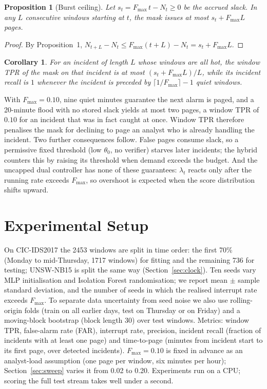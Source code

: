 \documentclass[journal,10pt,twocolumn]{IEEEtran}
\newtheorem{proposition}{Proposition}
\newtheorem{corollary}{Corollary}
\newcommand{\Fmax}{F_{\max}}
\begin{document}
\begin{proposition}[Burst ceiling]
Let $s_t=\Fmax\,t-N_t\ge0$ be the accrued slack. In any $L$ consecutive windows starting at $t$, the mask issues at most $s_t+\Fmax L$ pages.
\end{proposition}
\begin{proof}
By Proposition~1, $N_{t+L}-N_t\le\Fmax(t+L)-N_t=s_t+\Fmax L$.
\end{proof}

\begin{corollary}
For an incident of length $L$ whose windows are all hot, the window TPR of the mask on that incident is at most $(s_t+\Fmax L)/L$, while its incident recall is $1$ whenever the incident is preceded by $\lceil1/\Fmax\rceil-1$ quiet windows.
\end{corollary}

With $\Fmax=0.10$, nine quiet minutes guarantee the next alarm is paged, and a 20-minute flood with no stored slack yields at most two pages, a window TPR of $0.10$ for an incident that was in fact caught at once. Window TPR therefore penalises the mask for declining to page an analyst who is already handling the incident. Two further consequences follow. False pages consume slack, so a permissive fixed threshold (low $\theta_0$, no verifier) starves later incidents; the hybrid counters this by raising its threshold when demand exceeds the budget. And the uncapped dual controller has none of these guarantees: $\lambda_t$ reacts only after the running rate exceeds $\Fmax$, so overshoot is expected when the score distribution shifts upward.

\section{Experimental Setup}
On CIC-IDS2017 the 2453 windows are split in time order: the first 70\% (Monday to mid-Thursday, 1717 windows) for fitting and the remaining 736 for testing; UNSW-NB15 is split the same way (Section~\ref{sec:clock}). Ten seeds vary MLP initialisation and Isolation Forest randomisation; we report mean $\pm$ sample standard deviation, and the number of seeds in which the realised interrupt rate exceeds $\Fmax$. To separate data uncertainty from seed noise we also use rolling-origin folds (train on all earlier days, test on Thursday or on Friday) and a moving-block bootstrap (block length 30) over test windows. Metrics: window TPR, false-alarm rate (FAR), interrupt rate, precision, incident recall (fraction of incidents with at least one page) and time-to-page (minutes from incident start to its first page, over detected incidents). $\Fmax=0.10$ is fixed in advance as an analyst-load assumption (one page per window, six minutes per hour); Section~\ref{sec:sweep} varies it from 0.02 to 0.20. Experiments run on a CPU; scoring the full test stream takes well under a second.
\end{document}
